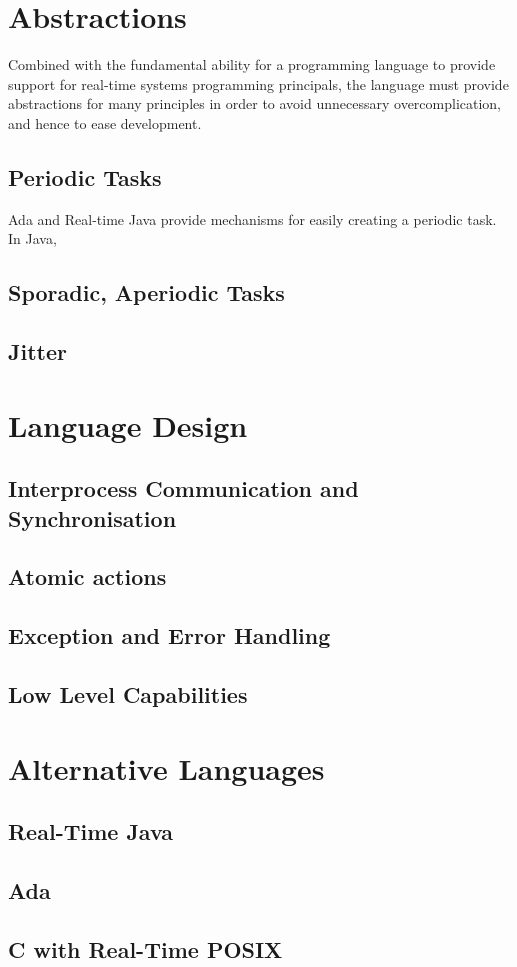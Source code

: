 \section{Abstractions}

Combined with the fundamental ability for a programming language to provide support 
for real-time systems programming principals, the language must provide abstractions 
for many principles in order to avoid unnecessary overcomplication, and hence to 
ease development.

\subsection{Periodic Tasks}
Ada and Real-time Java provide mechanisms for easily creating a periodic task. 
In Java,

\subsection{Sporadic, Aperiodic Tasks}
\subsection{Jitter}

\section{Language Design}
\subsection{Interprocess Communication and Synchronisation}
\subsection{Atomic actions}
\subsection{Exception and Error Handling}
\subsection{Low Level Capabilities}

\section{Alternative Languages}
\subsection{Real-Time Java}
\subsection{Ada}
\subsection{C with Real-Time POSIX}
